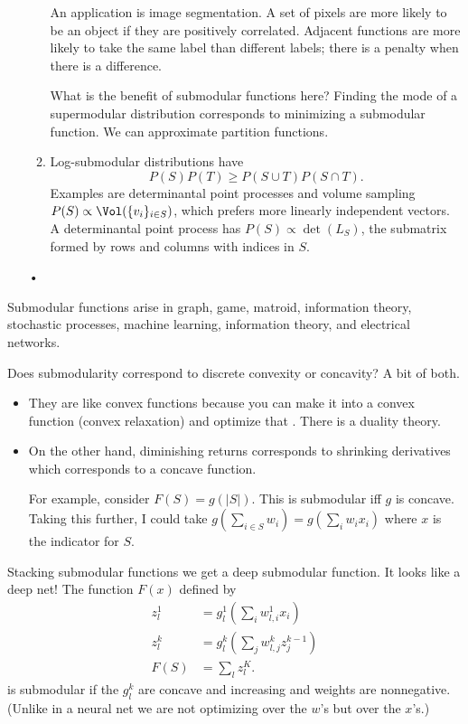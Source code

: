 \begin{enumerate}
\begin{enumerate}
An application is image segmentation. A set of pixels are more likely to be an object if they are positively correlated. Adjacent functions are more likely to take the same label than different labels; there is a penalty when there is a difference.

What is the benefit of submodular functions here? Finding the mode of a supermodular distribution corresponds to minimizing a submodular function. We can approximate partition functions. %
\item
Log-submodular distributions have
$$P(S)P(T)\ge P(S\cup T)P(S\cap T).$$
Examples are determinantal point processes and volume sampling $P(S)\propto \Vol(\{v_i\}_{i\in S})$, which prefers more linearly independent vectors. A determinantal point process has $P(S)\propto \det(L_S)$, the submatrix formed by rows and columns with indices in $S$.
\end{enumerate}•
\end{enumerate}

Submodular functions arise in graph, game, matroid, information theory, stochastic processes, machine learning, information theory, and electrical networks.

Does submodularity correspond to discrete convexity or concavity? A bit of both. 
\begin{itemize}
\item
They are like convex functions because you can make it into a convex function (convex relaxation) and optimize that . There is a duality theory. 
\item
On the other hand, diminishing returns corresponds to shrinking derivatives which corresponds to a concave function.

For example, consider $F(S)=g(|S|)$. This is submodular iff $g$ is concave.
Taking this further, I could take $g (\sum_{i\in S} w_i) = g(\sum_{i} w_ix_i)$ where $x$ is the indicator for $S$.
\end{itemize}


Stacking submodular functions we get a deep submodular function. It looks like a deep net!  The function $F(x)$ defined by
\begin{align}
z_l^1 &=g_l^1 (\sum_{i} w_{l,i}^1x_i)
\\
z_l^k &= g_l^k (\sum_j w_{l,j}^k z_j^{k-1})\\
F(S) &= \sum_l z_l^K.
\end{align}
is submodular if the  $g_l^k$ are concave and increasing and weights are nonnegative.
(Unlike in a neural net we are not optimizing over the $w$'s but over the $x$'s.)


